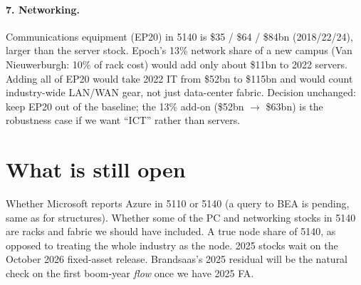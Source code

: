 \documentclass[11pt]{article}
\begin{document}
\paragraph{7. Networking.}
Communications equipment (EP20) in 5140 is \$35 / \$64 / \$84bn (2018/22/24), larger than the server stock. Epoch's 13\% network share of a new campus (Van Nieuwerburgh: 10\% of rack cost) would add only about \$11bn to 2022 servers. Adding all of EP20 would take 2022 IT from \$52bn to \$115bn and would count industry-wide LAN/WAN gear, not just data-center fabric. Decision unchanged: keep EP20 out of the baseline; the 13\% add-on (\$52bn $\to$ \$63bn) is the robustness case if we want ``ICT'' rather than servers.

\section{What is still open}

Whether Microsoft reports Azure in 5110 or 5140 (a query to BEA is pending, same as for structures). Whether some of the PC and networking stocks in 5140 are racks and fabric we should have included. A true node share of 5140, as opposed to treating the whole industry as the node. 2025 stocks wait on the October 2026 fixed-asset release. Brandsaas's 2025 residual will be the natural check on the first boom-year \emph{flow} once we have 2025 FA.
\end{document}
